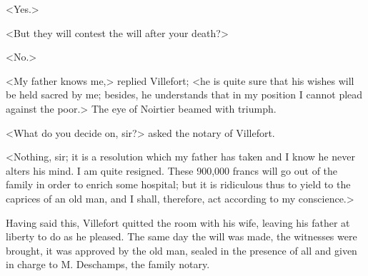  <Yes.> 

 <But they will contest the will after your death?> 

 <No.> 

 <My father knows me,> replied Villefort; <he is quite sure that his wishes will be held sacred by me; besides, he understands that in my position I cannot plead against the poor.> The eye of Noirtier beamed with triumph. 

 <What do you decide on, sir?> asked the notary of Villefort. 

 <Nothing, sir; it is a resolution which my father has taken and I know he never alters his mind. I am quite resigned. These 900,000 francs will go out of the family in order to enrich some hospital; but it is ridiculous thus to yield to the caprices of an old man, and I shall, therefore, act according to my conscience.> 

 Having said this, Villefort quitted the room with his wife, leaving his father at liberty to do as he pleased. The same day the will was made, the witnesses were brought, it was approved by the old man, sealed in the presence of all and given in charge to M. Deschamps, the family notary. 